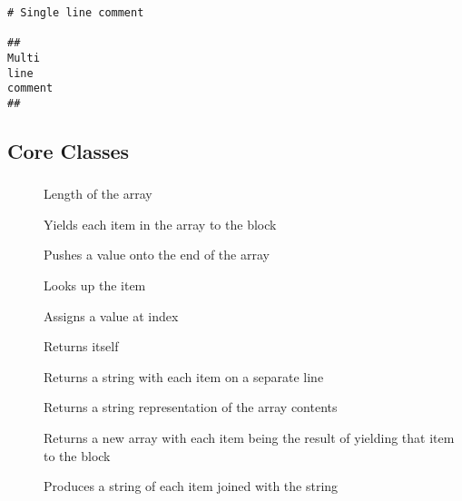 \begin{lstlisting}
# Single line comment

##
Multi
line
comment
##
\end{lstlisting}

\subsection{Core Classes}

\subsubsection{}

\begin{description}
  \item[] Length of the array
  \item[] Yields each item in the array to the block
  \item[] Pushes a value onto the end of the array
  \item[\code{[i]}] Looks up the item 
  \item[] Assigns a value at index 
  \item[] Returns itself
  \item[] Returns a string with each item on a separate line
  \item[] Returns a string representation of the array contents
  \item[] Returns a new array with each item being the result of yielding that item to the block
  \item[] Produces a string of each item joined with the  string
\end{description}

\subsubsection{}

